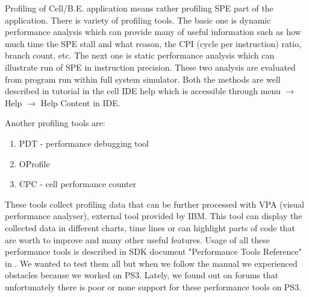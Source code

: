 \par
Profiling of Cell/B.E. application means rather profiling SPE part of the application.
There is variety of profiling tools.
The basic one is dynamic performance analysis which can provide many of useful information such as how much time the SPE stall and what reason, the CPI (cycle per instruction) ratio, branch count, etc.
The next one is static performance analysis which can illustrate run of SPE in instruction precision.
These two analysis are evaluated from program run within full system simulator.
Both the methods are well described in tutorial in the cell IDE help which is accessible through menu $\rightarrow$ Help $\rightarrow$ Help Content in IDE.

\par
Another profiling tools are:
\begin{enumerate}
\item{PDT - performance debugging tool}
\item{OProfile}
\item{CPC - cell performance counter}
\end{enumerate}

These tools collect profiling data that can be further processed with VPA (visual performance analyser), external tool provided by IBM.
This tool can display the collected data in different charts, time lines or can highlight parts of code that are worth to improve and many other useful features.
Usage of all these performance tools is described in SDK document "Performance Tools Reference" in \cite{performanceToolRef}.
We wanted to test them all but when we follow the manual we experienced obstacles because we worked on PS3.
Lately, we found out on forums that unfortunately there is poor or none support for these performance tools on PS3.
